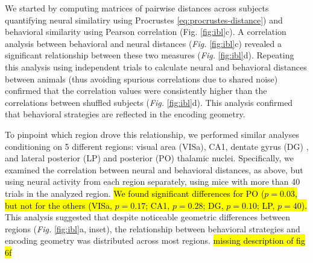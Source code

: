 We started by computing matrices of pairwise distances across subjects quantifying neural similatiry using Procrustes \cref{eq:procrustes-distance}) and behavioral similarity using Pearson correlation (Fig. \ref{fig:ibl}c). A correlation analysis between behavioral and neural distances (\textit{Fig.} \ref{fig:ibl}c) revealed a significant relationship between these two measures (\textit{Fig.} \ref{fig:ibl}d). Repeating this analysis using independent trials to calculate neural and behavioral distances between animals (thus avoiding spurious correlations due to shared noise) confirmed that the correlation values were consistently higher than the correlations between shuffled subjects (\textit{Fig.} \ref{fig:ibl}d). This analysis confirmed that behavioral strategies are reflected in the encoding geometry. 

To pinpoint which region drove this relationship, we performed similar analyses conditioning on 5 different regions: visual area (VISa), CA1, dentate gyrus (DG) , and lateral posterior (LP) and posterior (PO) thalamic nuclei. Specifically, we examined the correlation between neural and behavioral distances, as above, but using neural activity from each region separately, using mice with more than 40 trials in the analyzed region. \hl{We found significant differences for PO ($p=0.03$, but not for the others (VISa, $p=0.17$; CA1, $p=0.28$; DG, $p=0.10$; LP, $p=40$).} This analysis suggested that despite noticeable geometric differences between regions (\textit{Fig.} \ref{fig:ibl}a, inset), the relationship between behavioral strategies and encoding geometry was distributed across most regions. \hl{missing description of fig 6f}

